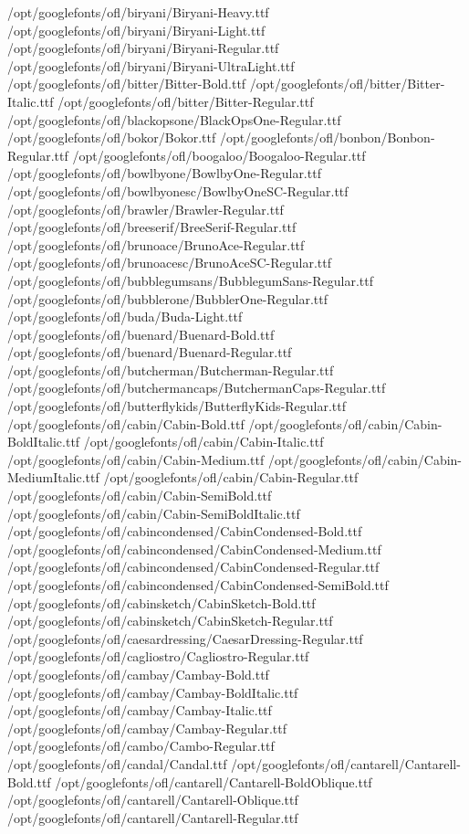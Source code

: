 /opt/googlefonts/ofl/biryani/Biryani-Heavy.ttf
/opt/googlefonts/ofl/biryani/Biryani-Light.ttf
/opt/googlefonts/ofl/biryani/Biryani-Regular.ttf
/opt/googlefonts/ofl/biryani/Biryani-UltraLight.ttf
/opt/googlefonts/ofl/bitter/Bitter-Bold.ttf
/opt/googlefonts/ofl/bitter/Bitter-Italic.ttf
/opt/googlefonts/ofl/bitter/Bitter-Regular.ttf
/opt/googlefonts/ofl/blackopsone/BlackOpsOne-Regular.ttf
/opt/googlefonts/ofl/bokor/Bokor.ttf
/opt/googlefonts/ofl/bonbon/Bonbon-Regular.ttf
/opt/googlefonts/ofl/boogaloo/Boogaloo-Regular.ttf
/opt/googlefonts/ofl/bowlbyone/BowlbyOne-Regular.ttf
/opt/googlefonts/ofl/bowlbyonesc/BowlbyOneSC-Regular.ttf
/opt/googlefonts/ofl/brawler/Brawler-Regular.ttf
/opt/googlefonts/ofl/breeserif/BreeSerif-Regular.ttf
/opt/googlefonts/ofl/brunoace/BrunoAce-Regular.ttf
/opt/googlefonts/ofl/brunoacesc/BrunoAceSC-Regular.ttf
/opt/googlefonts/ofl/bubblegumsans/BubblegumSans-Regular.ttf
/opt/googlefonts/ofl/bubblerone/BubblerOne-Regular.ttf
/opt/googlefonts/ofl/buda/Buda-Light.ttf
/opt/googlefonts/ofl/buenard/Buenard-Bold.ttf
/opt/googlefonts/ofl/buenard/Buenard-Regular.ttf
/opt/googlefonts/ofl/butcherman/Butcherman-Regular.ttf
/opt/googlefonts/ofl/butchermancaps/ButchermanCaps-Regular.ttf
/opt/googlefonts/ofl/butterflykids/ButterflyKids-Regular.ttf
/opt/googlefonts/ofl/cabin/Cabin-Bold.ttf
/opt/googlefonts/ofl/cabin/Cabin-BoldItalic.ttf
/opt/googlefonts/ofl/cabin/Cabin-Italic.ttf
/opt/googlefonts/ofl/cabin/Cabin-Medium.ttf
/opt/googlefonts/ofl/cabin/Cabin-MediumItalic.ttf
/opt/googlefonts/ofl/cabin/Cabin-Regular.ttf
/opt/googlefonts/ofl/cabin/Cabin-SemiBold.ttf
/opt/googlefonts/ofl/cabin/Cabin-SemiBoldItalic.ttf
/opt/googlefonts/ofl/cabincondensed/CabinCondensed-Bold.ttf
/opt/googlefonts/ofl/cabincondensed/CabinCondensed-Medium.ttf
/opt/googlefonts/ofl/cabincondensed/CabinCondensed-Regular.ttf
/opt/googlefonts/ofl/cabincondensed/CabinCondensed-SemiBold.ttf
/opt/googlefonts/ofl/cabinsketch/CabinSketch-Bold.ttf
/opt/googlefonts/ofl/cabinsketch/CabinSketch-Regular.ttf
/opt/googlefonts/ofl/caesardressing/CaesarDressing-Regular.ttf
/opt/googlefonts/ofl/cagliostro/Cagliostro-Regular.ttf
/opt/googlefonts/ofl/cambay/Cambay-Bold.ttf
/opt/googlefonts/ofl/cambay/Cambay-BoldItalic.ttf
/opt/googlefonts/ofl/cambay/Cambay-Italic.ttf
/opt/googlefonts/ofl/cambay/Cambay-Regular.ttf
/opt/googlefonts/ofl/cambo/Cambo-Regular.ttf
/opt/googlefonts/ofl/candal/Candal.ttf
/opt/googlefonts/ofl/cantarell/Cantarell-Bold.ttf
/opt/googlefonts/ofl/cantarell/Cantarell-BoldOblique.ttf
/opt/googlefonts/ofl/cantarell/Cantarell-Oblique.ttf
/opt/googlefonts/ofl/cantarell/Cantarell-Regular.ttf

